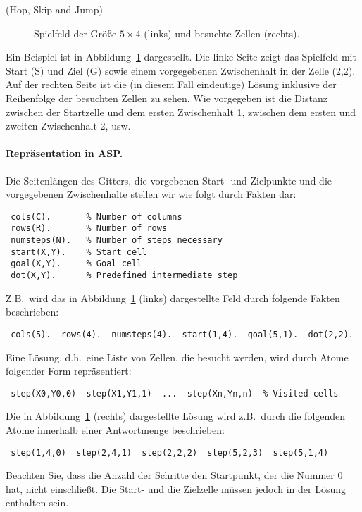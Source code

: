 \documentclass[a4paper,12pt,ngerman]{article}
\begin{document}
\begin{PraktikumsAufgabe}{1}{(Hop, Skip and Jump)}
\begin{figure}[h]
\begin{center}
\end{center}
\vspace*{-6mm}
\caption{Spielfeld der Gr\"o{\ss}e $5\times 4$ (links) und 
         besuchte Zellen (rechts).\label{fig:laby}}
\end{figure}

\noindent
Ein Beispiel ist in Abbildung~\ref{fig:laby} dargestellt.
Die linke Seite zeigt das Spielfeld mit Start (S) und Ziel (G) sowie einem vorgegebenen Zwischenhalt in der Zelle (2,2).
Auf der rechten Seite ist die (in diesem Fall eindeutige) Lösung inklusive der Reihenfolge der besuchten Zellen zu sehen.
Wie vorgegeben ist die Distanz zwischen der Startzelle und dem ersten Zwischenhalt 1, zwischen dem ersten und zweiten Zwischenhalt 2, usw.

\paragraph{Repräsentation in ASP.}
Die Seitenlängen des Gitters,
die vorgebenen Start- und Zielpunkte und
die vorgegebenen Zwischenhalte stellen wir wie folgt durch Fakten %
dar:
%
\vspace{-1.5mm}
\begin{verbatim}
 cols(C).       % Number of columns
 rows(R).       % Number of rows
 numsteps(N).   % Number of steps necessary
 start(X,Y).    % Start cell
 goal(X,Y).     % Goal cell
 dot(X,Y).      % Predefined intermediate step
\end{verbatim}
\vspace{-1mm}
Z.B.\ wird das in Abbildung~\ref{fig:laby} (links) dargestellte Feld %
durch folgende Fakten beschrieben:%
\vspace{-1.5mm}
\begin{verbatim}
 cols(5).  rows(4).  numsteps(4).  start(1,4).  goal(5,1).  dot(2,2).
\end{verbatim}
\vspace{-1mm}
Eine Lösung, d.h.\ eine Liste von Zellen, die besucht werden, wird durch Atome folgender Form repräsentiert:
\vspace{-1.5mm}
\begin{verbatim}
 step(X0,Y0,0)  step(X1,Y1,1)  ...  step(Xn,Yn,n)  % Visited cells
\end{verbatim}
\vspace{-1mm}
Die in Abbildung~\ref{fig:laby} (rechts) dargestellte Lösung wird z.B.\
durch die folgenden Atome innerhalb einer Antwortmenge beschrieben:
\vspace{-1.5mm}
\begin{verbatim}
 step(1,4,0)  step(2,4,1)  step(2,2,2)  step(5,2,3)  step(5,1,4)
\end{verbatim}
\vspace{-1mm}
Beachten Sie, dass die Anzahl der Schritte den Startpunkt, der die Nummer 0 hat,
nicht einschließt. %
Die Start- %
und die Zielzelle müssen jedoch in der Lösung enthalten sein.


\end{PraktikumsAufgabe}
\end{document}
